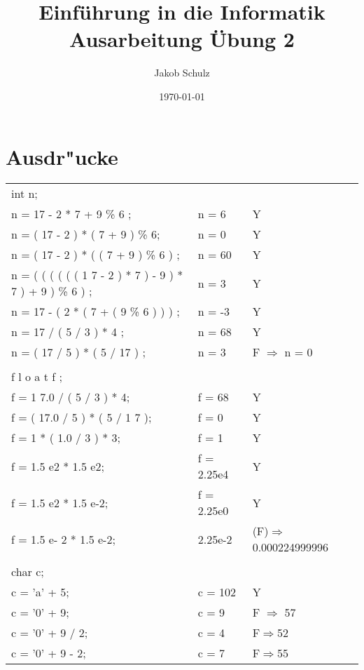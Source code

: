 \documentclass[a4paper,11pt,titlepage]{article}
\begin{document}
\title{Einf\"uhrung in die Informatik\\
Ausarbeitung \"Ubung 2}


\author{Jakob Schulz}


\date{\today}

\maketitle{\thispagestyle{plain}}

\section{Ausdr"ucke}
\begin{tabular}{lll}
int n;\\
n = 17 - 2 * 7 + 9 \% 6 ;&n = 6& Y\\
n = ( 17 - 2 ) * ( 7 + 9 ) \% 6;&n = 0& Y\\
n = ( 17 - 2 ) * ( ( 7 + 9 ) \% 6 ) ;& n = 60 &Y\\
n = ( ( ( ( ( ( 1 7 - 2 ) * 7 ) - 9 ) * 7 ) + 9 ) \% 6 ) ; &n = 3 &Y\\
n = 17 - ( 2 * ( 7 + ( 9 \% 6 ) ) ) ;&n = -3 &Y\\
n = 17 / ( 5 / 3 ) * 4 ;	 &n = 68 &Y\\
n = ( 17 / 5 ) * ( 5 / 17 ) ; &n = 3 &F $\Rightarrow$ n = 0\\
\\
f l o a t f ;\\
f = 1 7.0 / ( 5 / 3 ) * 4;& f = 68& Y\\
f = ( 17.0 / 5 ) * ( 5 / 1 7 );&f = 0& Y\\
f = 1 * ( 1.0 / 3 ) * 3;& f = 1&Y\\
f = 1.5 e2 * 1.5 e2;&f = 2.25e4&Y\\
f = 1.5 e2 * 1.5 e-2;&f = 2.25e0&Y\\
f = 1.5 e- 2 * 1.5 e-2;&2.25e-2&(F)$\Rightarrow$ 0.000224999996\\
\\
char c;\\
c = 'a' + 5;&	c = 102&Y\\
c = '0' + 9;&c =  9&F $\Rightarrow$ 57\\
c = '0' + 9 / 2;&c = 4&F$\Rightarrow$52\\
c = '0' + 9 - 2;&c = 7&F$\Rightarrow$55\\

\end{tabular}
\end{document}
